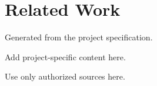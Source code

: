 \section{Related Work}
Generated from the project specification.

Add project-specific content here.

Use only authorized sources here.
